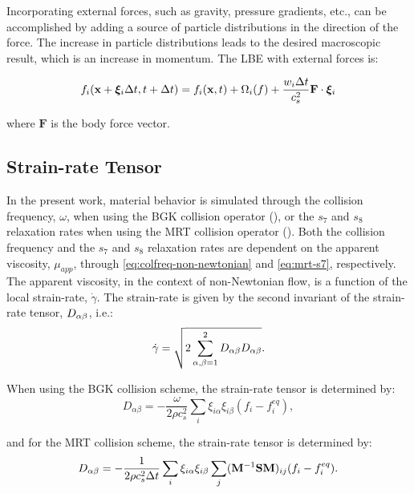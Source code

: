 Incorporating external forces, such as gravity, pressure gradients, etc., can be accomplished by adding a source of particle distributions in the direction of the force.
The increase in particle distributions leads to the desired macroscopic result, which is an increase in momentum.
The LBE with external forces is:

\begin{equation}
f_i(\mathbf{x} + \boldsymbol{\xi}_i \Delta t, t + \Delta t) = f_i(\mathbf{x}, t) + \Omega_i(f) + \frac{w_i \Delta t}{c_s^2} \mathbf{F} \cdot \boldsymbol{\xi}_i
\end{equation}

\noindent where $\mathbf{F}$ is the body force vector.

\subsection{Strain-rate Tensor}

In the present work, material behavior is simulated through the collision frequency, $\omega$, when using the BGK collision operator (), or the $s_7$ and $s_8$ relaxation rates when using the MRT collision operator ().
Both the collision frequency and the $s_7$ and $s_8$ relaxation rates are dependent on the apparent viscosity, $\mu_{app}$, through \eqref{eq:colfreq-non-newtonian} and \eqref{eq:mrt-s7}, respectively.
The apparent viscosity, in the context of non-Newtonian flow, is a function of the local strain-rate, $\dot{\gamma}$.
The strain-rate is given by the second invariant of the strain-rate tensor, $D_{\alpha\beta}$, i.e.:
\begin{equation} \label{eq:second-invariant}
\dot{\gamma} = \sqrt{2 \sum_{\alpha,\beta=1}^{2} D_{\alpha\beta} D_{\alpha\beta}}.
\end{equation}

\noindent When using the BGK collision scheme, the strain-rate tensor is determined by:
\begin{equation} \label{eq:srtensor-bgk}
D_{\alpha \beta} = -\frac{\omega}{2 \rho c_s^2} \sum_i \xi_{i \alpha} \xi_{i \beta} (f_i - f^{eq}_i),
\end{equation}

\noindent and for the MRT collision scheme, the strain-rate tensor is determined by:
\begin{equation} \label{eq:srtensor-mrt}
D_{\alpha \beta} = -\frac{1}{2 \rho c_s^2 \Delta t} \sum_i \xi_{i \alpha} \xi_{i \beta} \sum_j (\mathbf{M}^{-1} \mathbf{S} \mathbf{M})_{ij}(f_i - f^{eq}_i).
\end{equation}

